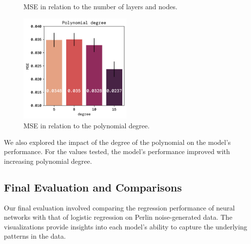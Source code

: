 \documentclass[twoside,11pt]{report}
\begin{document}
\begin{figure}[!ht]
\begin{minipage}[t]{0.5\textwidth - 1mm}
\begin{center}
            \end{center}
            \caption
            {
                MSE in relation to the number of layers and nodes.
            }\label{fig:MSE_layers_nodes}
        \end{minipage}
    \end{figure}

    \noindent


    \begin{figure}[!ht]
        \begin{center}
            \includegraphics[width=0.5\textwidth]{../runsAndFigures/MSE_degree.png}
        \end{center}
        \caption
        {
            MSE in relation to the polynomial degree.
        }\label{fig:}
    \end{figure}


    \newpage
    \noindent
    We also explored the impact of the degree of the polynomial on the model's performance.
    For the values tested, the model's performance improved with increasing polynomial degree.

\newpage
\newpage
\subsection*{Final Evaluation and Comparisons}
\label{sec:comparisons2}


    Our final evaluation involved comparing the regression performance of neural networks with that of logistic 
    regression on Perlin noise-generated data. The visualizations provide insights into each model's ability to 
    capture the underlying patterns in the data.
\end{document}
